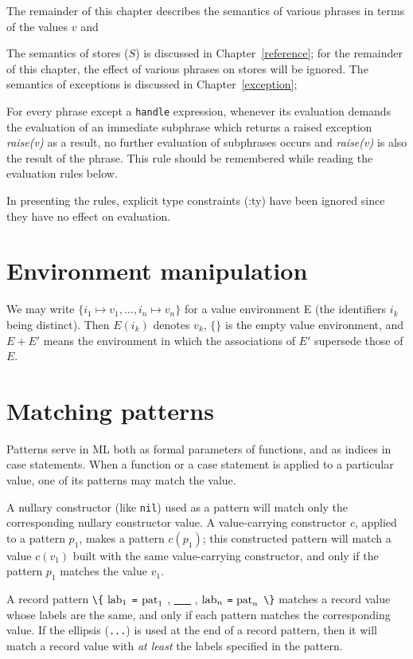 The remainder of this chapter describes the semantics of various
phrases in terms of the values $v$ and 

The semantics of stores ($S$) is discussed in
Chapter~\ref{reference};
for the remainder of this chapter, the
effect of various phrases on stores will be ignored.
The semantics of exceptions is discussed in
Chapter~\ref{exception}; 


For every phrase except a \verb"handle" expression, whenever its
evaluation demands the evaluation of an immediate subphrase which
returns a raised exception {\em raise(v)} as a result, no further
evaluation of subphrases occurs and {\em raise(v)} is also the result
of the phrase.  This rule should be remembered while reading the
evaluation rules below.

In presenting the rules, explicit type
constraints (:ty) have been ignored since they have no effect on
evaluation.

\section{Environment manipulation}
We may write $\{ i_1 \mapsto v_1 , ... , i_n \mapsto v_n \}$ for a
value environment E (the identifiers $i_k$ being distinct).  Then
$E(i_k)$ denotes $v_k$, $\{\}$ is the empty value environment, and
$E+E'$ means the environment in which the associations of $E'$
supersede those of $E$.

\section{Matching patterns}
Patterns serve in ML both as formal parameters of functions, and
as indices in case statements.  When a function or a case statement
is applied to a particular value, one of its patterns may match the
value.

A nullary constructor (like \verb"nil") used as a pattern
will match only the corresponding nullary constructor value.  A
value-carrying constructor $c$, applied to a pattern $p_1$, makes a pattern
$c(p_1)$;
this constructed pattern will match a value $c(v_1)$
built with the same value-carrying constructor, and only if the
pattern $p_1$ matches the value $v_1$.

A record pattern 
\verb"\{" ${\rm lab}_1$ \verb"=" ${\rm pat}_1$ , \underline{\ \ \ } , ${\rm lab}_n$ \verb"=" ${\rm pat}_n$ \verb"\}"
matches a record value whose labels are the same, and only if each
pattern matches the corresponding value.
If the ellipsis (\verb"...") is used at the end of a record pattern,
then it will match a record value with {\it at least} the labels
specified in the pattern.

